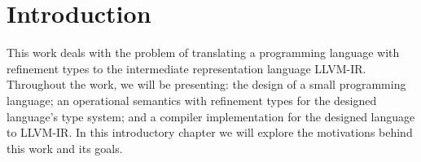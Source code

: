 \documentclass[english, lmodern, oneside, nopageanchorhack]{ufsc-thesis-rn46-2019}
\begin{document}
\listoffigures*  %


\tableofcontents*%

\textual%

\chapter{Introduction}\label{chapter:introduction}

This work deals with the problem of translating a programming language with refinement types to the intermediate representation language LLVM-IR.\@
Throughout the work, we will be presenting: the design of a small programming language; an operational semantics with refinement types for the designed language's type system; and a compiler implementation for the designed language to LLVM-IR.\@
In this introductory chapter we will explore the motivations behind this work and its goals.
\end{document}
